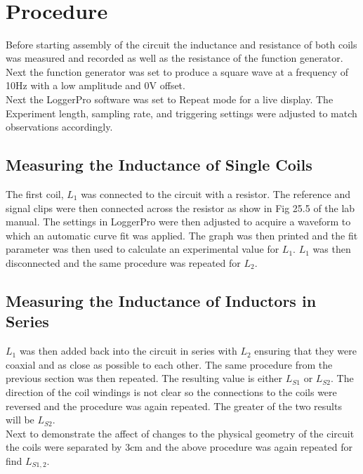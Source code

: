 \documentclass{article}
\begin{document}
\ 

\ 

\ 

\ 

\ 

\ 

\ 

\ 

\ 

\ 
\ 

\ 
\section{Procedure}
Before starting assembly of the circuit the inductance and resistance of both coils was measured and recorded as well as the resistance of the function generator. Next the function generator was set to produce a square wave at a frequency of 10Hz with a low amplitude and 0V offset.\\

Next the LoggerPro software was set to Repeat mode for a live display. The Experiment length, sampling rate, and triggering settings were adjusted to match observations accordingly.
\subsection{Measuring the Inductance of Single Coils}
The first coil, $L_1$ was connected to the circuit with a resistor. The reference and signal clips were then connected across the resistor as show in Fig 25.5 of the lab manual. The settings in LoggerPro were then adjusted to acquire a waveform to which an automatic curve fit was applied. The graph was then printed and the fit parameter was then used to calculate an experimental value for $L_1$. $L_1$ was then disconnected and the same procedure was repeated for $L_2$.
\subsection{Measuring the Inductance of Inductors in Series}
$L_1$ was then added back into the circuit in series with $L_2$ ensuring that they were coaxial and as close as possible to each other. The same procedure from the previous section was then repeated. The resulting value is either $L_{S1}$ or $L_{S2}$. The direction of the coil windings is not clear so the connections to the coils were reversed and the procedure was again repeated. The greater of the two results will be $L_{S2}$.\\

Next to demonstrate the affect of changes to the physical geometry of the circuit the coils were separated by 3cm and the above procedure was again repeated for find $L_{S1,2}$.
\end{document}
